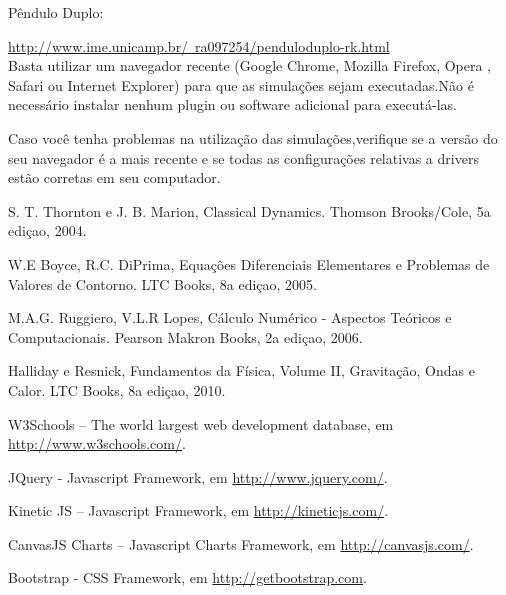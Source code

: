\documentclass[13pt,a4paper]{report}
\begin{document}
Pêndulo Duplo:

\href{http://www.ime.unicamp.br/~ra097254/penduloduplo-rk.html}{http://www.ime.unicamp.br/~ra097254/penduloduplo-rk.html}
\\

Basta utilizar um navegador recente (Google Chrome, Mozilla Firefox, Opera , Safari ou Internet Explorer) para que as simulações sejam executadas.Não é necessário instalar nenhum plugin ou software adicional para executá-las.

Caso você tenha problemas na utilização das simulações,verifique se a versão do seu navegador é a mais recente e se todas as configurações relativas a drivers estão corretas em seu computador.
\clearpage


\begin{thebibliography}{9}

  S. T. Thornton e J. B. Marion,
  Classical Dynamics.
  Thomson Brooks/Cole,
  5a ediçao,
  2004.
  
  W.E Boyce, R.C. DiPrima,
  Equações Diferenciais Elementares e Problemas de Valores de Contorno.
  LTC Books,
  8a ediçao,
  2005.
  
  M.A.G. Ruggiero, V.L.R Lopes,
  Cálculo Numérico - Aspectos Teóricos e Computacionais.
  Pearson Makron Books,
  2a ediçao,
  2006.
 
  Halliday e Resnick,
  Fundamentos da Física, Volume II, Gravitação, Ondas e Calor.
  LTC Books,
  8a ediçao,
  2010.
  
  W3Schools – The world largest web development database, 
  em \href{http://www.w3schools.com/}{http://www.w3schools.com/}.
  
  JQuery - Javascript Framework, 
  em \href{http://www.jquery.com/}{http://www.jquery.com/}.
   
  Kinetic JS – Javascript Framework, 
  em \href{http://kineticjs.com/}{http://kineticjs.com/}.

  CanvasJS Charts – Javascript Charts Framework, 
  em \href{http://canvasjs.com/}{http://canvasjs.com/}.
  
  Bootstrap - CSS Framework, 
  em \href{http://getbootstrap.com}{http://getbootstrap.com}.

\end{thebibliography}
\end{document}
